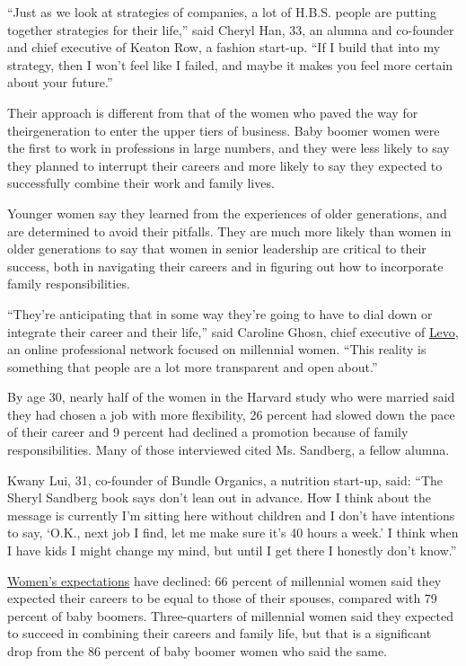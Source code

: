 ``Just as we look at strategies of companies, a lot of H.B.S. people are
putting together strategies for their life,'' said Cheryl Han, 33, an
alumna and co-founder and chief executive of Keaton Row, a fashion
start-up. ``If I build that into my strategy, then I won't feel like I
failed, and maybe it makes you feel more certain about your future.''

Their approach is different from that of the women who paved the way for
theirgeneration to enter the upper tiers of business. Baby boomer women
were the first to work in professions in large numbers, and they were
less likely to say they planned to interrupt their careers and more
likely to say they expected to successfully combine their work and
family lives.

Younger women say they learned from the experiences of older
generations, and are determined to avoid their pitfalls. They are much
more likely than women in older generations to say that women in senior
leadership are critical to their success, both in navigating their
careers and in figuring out how to incorporate family responsibilities.

``They're anticipating that in some way they're going to have to dial
down or integrate their career and their life,'' said Caroline Ghosn,
chief executive of \href{http://www.levo.com/}{Levo}, an online
professional network focused on millennial women. ``This reality is
something that people are a lot more transparent and open about.''

By age 30, nearly half of the women in the Harvard study who were
married said they had chosen a job with more flexibility, 26 percent had
slowed down the pace of their career and 9 percent had declined a
promotion because of family responsibilities. Many of those interviewed
cited Ms. Sandberg, a fellow alumna.

Kwany Lui, 31, co-founder of Bundle Organics, a nutrition start-up,
said: ``The Sheryl Sandberg book says don't lean out in advance. How I
think about the message is currently I'm sitting here without children
and I don't have intentions to say, `O.K., next job I find, let me make
sure it's 40 hours a week.' I think when I have kids I might change my
mind, but until I get there I honestly don't know.''

\href{http://www.nytimes3xbfgragh.onion/2014/11/30/upshot/even-among-harvard-graduates-women-fall-short-of-their-work-expectations.html}{Women's
expectations} have declined: 66 percent of millennial women said they
expected their careers to be equal to those of their spouses, compared
with 79 percent of baby boomers. Three-quarters of millennial women said
they expected to succeed in combining their careers and family life, but
that is a significant drop from the 86 percent of baby boomer women who
said the same.

